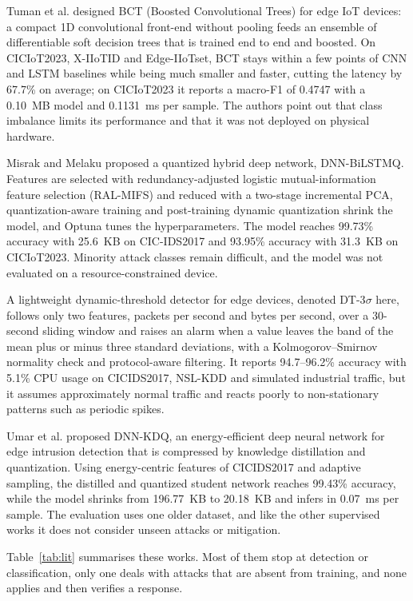 \documentclass[]{interact}
\theoremstyle{plain}
\theoremstyle{definition}
\begin{document}
Tuman et al.\cite{tuman2025edge} designed BCT (Boosted Convolutional Trees) for edge IoT devices: a compact 1D convolutional front-end without pooling feeds an ensemble of differentiable soft decision trees that is trained end to end and boosted. On CICIoT2023, X-IIoTID and Edge-IIoTset, BCT stays within a few points of CNN and LSTM baselines while being much smaller and faster, cutting the latency by 67.7\% on average; on CICIoT2023 it reports a macro-F1 of 0.4747 with a 0.10~MB model and 0.1131~ms per sample. The authors point out that class imbalance limits its performance and that it was not deployed on physical hardware.

Misrak and Melaku\cite{misrak2025lightweight} proposed a quantized hybrid deep network, DNN-BiLSTMQ. Features are selected with redundancy-adjusted logistic mutual-information feature selection (RAL-MIFS) and reduced with a two-stage incremental PCA, quantization-aware training and post-training dynamic quantization shrink the model, and Optuna tunes the hyperparameters. The model reaches 99.73\% accuracy with 25.6~KB on CIC-IDS2017 and 93.95\% accuracy with 31.3~KB on CICIoT2023. Minority attack classes remain difficult, and the model was not evaluated on a resource-constrained device.

A lightweight dynamic-threshold detector for edge devices\cite{dynamic_ids2025}, denoted DT-3$\sigma$ here, follows only two features, packets per second and bytes per second, over a 30-second sliding window and raises an alarm when a value leaves the band of the mean plus or minus three standard deviations, with a Kolmogorov--Smirnov normality check and protocol-aware filtering. It reports 94.7--96.2\% accuracy with 5.1\% CPU usage on CICIDS2017, NSL-KDD and simulated industrial traffic, but it assumes approximately normal traffic and reacts poorly to non-stationary patterns such as periodic spikes.

Umar et al.\cite{umar2025energy} proposed DNN-KDQ, an energy-efficient deep neural network for edge intrusion detection that is compressed by knowledge distillation and quantization. Using energy-centric features of CICIDS2017 and adaptive sampling, the distilled and quantized student network reaches 99.43\% accuracy, while the model shrinks from 196.77~KB to 20.18~KB and infers in 0.07~ms per sample. The evaluation uses one older dataset, and like the other supervised works it does not consider unseen attacks or mitigation.

Table~\ref{tab:lit} summarises these works. Most of them stop at detection or classification, only one deals with attacks that are absent from training, and none applies and then verifies a response.
\end{document}
